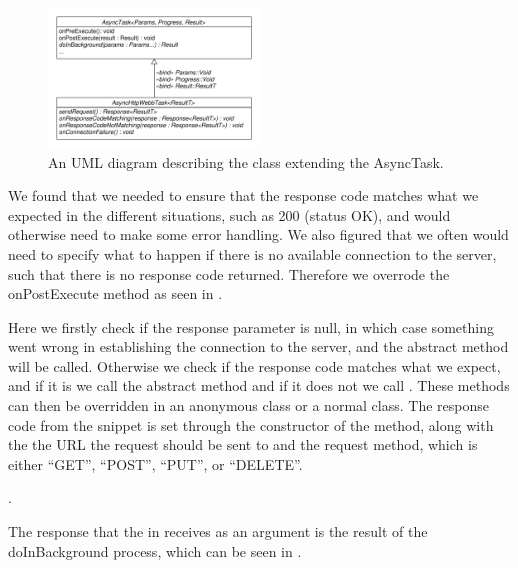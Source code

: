 \begin{figure}[!htbp]
    \centering
    \includegraphics[width=0.5\textwidth]{graphic/architecture/async_http_webb_task.pdf}
    \caption{An UML diagram describing the class extending the AsyncTask.}
    \label{fig:async_http_webb_task}
\end{figure}
\FloatBarrier

We found that we needed to ensure that the response code matches what we expected in the different situations, such as 200 (status OK), and would otherwise need to make some error handling. We also figured that we often would need to specify what to happen if there is no available connection to the server, such that there is no response code returned. Therefore we overrode the onPostExecute method as seen in . 


\FloatBarrier

Here we firstly check if the response parameter is null, in which case something went wrong in establishing the connection to the server, and the abstract method  will be called. Otherwise we check if the response code matches what we expect, and if it is we call the abstract method  and if it does not we call . These methods can then be overridden in an anonymous class or a normal class. The response code from the snippet is set through the constructor of the method, along with the the URL the request should be sent to and the request method, which is either ``GET'', ``POST'', ``PUT'', or ``DELETE''. 

.

The response that the  in  receives as an argument is the result of the doInBackground process, which can be seen in . 

